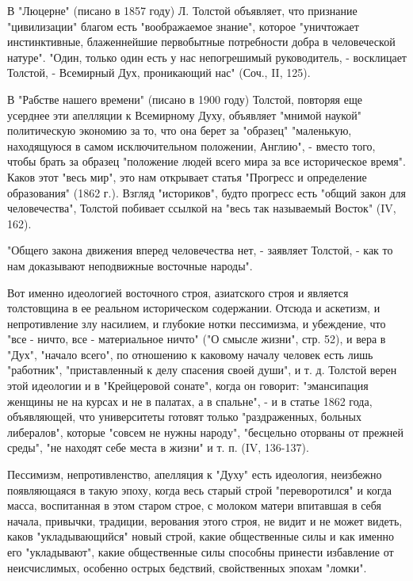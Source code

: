\documentclass[12pt]{article}
\newcommand{\parnum}{(\arabic{parcount})}
\newcounter{parcount}
\newenvironment{parnumbers}{%
  \par%
  \everypar{\noindent \stepcounter{parcount}\marginpar[]{\parnum}}%
}{}
\begin{document}
\begin{parnumbers}
В "Люцерне" (писано в 1857 году) Л. Толстой объявляет, что признание "цивилизации" благом есть "воображаемое знание", которое "уничтожает инстинктивные, блаженнейшие первобытные потребности добра в человеческой натуре". "Один, только один есть у нас непогрешимый руководитель, - восклицает Толстой, - Всемирный Дух, проникающий нас" (Соч., II, 125).

В "Рабстве нашего времени" (писано в 1900 году) Толстой, повторяя еще усерднее эти апелляции к Всемирному Духу, объявляет "мнимой наукой" политическую экономию за то, что она берет за "образец" "маленькую, находящуюся в самом исключительном положении, Англию", - вместо того, чтобы брать за образец "положение людей всего мира за все историческое время". Каков этот "весь мир", это нам открывает статья "Прогресс и определение образования" (1862 г.). Взгляд "историков", будто прогресс есть "общий закон для человечества", Толстой побивает ссылкой на "весь так называемый Восток" (IV, 162).

"Общего закона движения вперед человечества нет, - заявляет Толстой, - как то нам доказывают неподвижные восточные народы".

Вот именно идеологией восточного строя, азиатского строя и является толстовщина в ее реальном историческом содержании. Отсюда и аскетизм, и непротивление злу насилием, и глубокие нотки пессимизма, и убеждение, что "все - ничто, все - материальное ничто" ("О смысле жизни", стр. 52), и вера в "Дух", "начало всего", по отношению к каковому началу человек есть лишь "работник", "приставленный к делу спасения своей души", и т. д. Толстой верен этой идеологии и в "Крейцеровой сонате", когда он говорит: "эмансипация женщины не на курсах и не в палатах, а в спальне", - и в статье 1862 года, объявляющей, что университеты готовят только "раздраженных, больных либералов", которые "совсем не нужны народу", "бесцельно оторваны от прежней среды", "не находят себе места в жизни" и т. п. (IV, 136-137).

Пессимизм, непротивленство, апелляция к "Духу" есть идеология, неизбежно появляющаяся в такую эпоху, когда весь старый строй "переворотился" и когда масса, воспитанная в этом старом строе, с молоком матери впитавшая в себя начала, привычки, традиции, верования этого строя, не видит и не может видеть, каков "укладывающийся" новый строй, какие общественные силы и как именно его "укладывают", какие общественные силы способны принести избавление от неисчислимых, особенно острых бедствий, свойственных эпохам "ломки".


\end{parnumbers}
\end{document}
